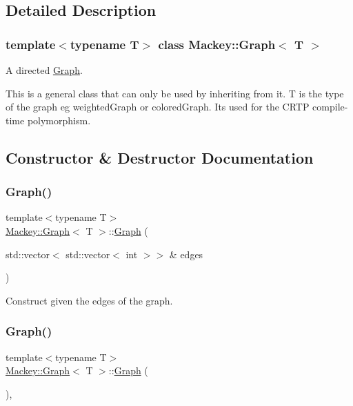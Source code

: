 \subsection{Detailed Description}
\subsubsection*{template$<$typename T$>$\newline
class Mackey\+::\+Graph$<$ T $>$}

A directed \hyperlink{classMackey_1_1Graph}{Graph}. 

This is a general class that can only be used by inheriting from it. T is the type of the graph eg weighted\+Graph or colored\+Graph. It\textquotesingle{}s used for the C\+R\+TP compile-\/time polymorphism. 

\subsection{Constructor \& Destructor Documentation}
\mbox{\label{classMackey_1_1Graph_a979aefd7d97cd0344637180c00e7db1b}} 
\subsubsection{\texorpdfstring{Graph()}{Graph()}\hspace{0.1cm}{\footnotesize\ttfamily [1/2]}}
{\footnotesize\ttfamily template$<$typename T$>$ \\
\hyperlink{classMackey_1_1Graph}{Mackey\+::\+Graph}$<$ T $>$\+::\hyperlink{classMackey_1_1Graph}{Graph} (\begin{DoxyParamCaption}\item[{std\+::vector$<$ std\+::vector$<$ int $>$$>$ \&}]{edges }\end{DoxyParamCaption})\hspace{0.3cm}{\ttfamily [inline]}}



Construct given the edges of the graph. 

\mbox{\label{classMackey_1_1Graph_a910e6687de1a1a90df5b656e3c850a01}} 
\subsubsection{\texorpdfstring{Graph()}{Graph()}\hspace{0.1cm}{\footnotesize\ttfamily [2/2]}}
{\footnotesize\ttfamily template$<$typename T$>$ \\
\hyperlink{classMackey_1_1Graph}{Mackey\+::\+Graph}$<$ T $>$\+::\hyperlink{classMackey_1_1Graph}{Graph} (\begin{DoxyParamCaption}{ }\end{DoxyParamCaption})\hspace{0.3cm}{\ttfamily [inline]}, {\ttfamily [protected]}}



